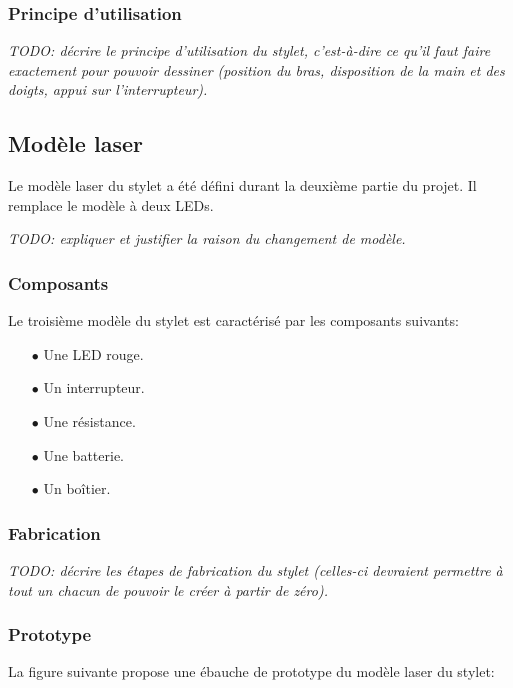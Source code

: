 \documentclass[11pt,a4paper,oldfontcommands]{memoir}
\begin{document}
\subsubsection{Principe d'utilisation}

\textit{TODO: décrire le principe d'utilisation du stylet, c'est-à-dire ce qu'il faut faire exactement pour pouvoir dessiner (position du bras, disposition de la main et des doigts, appui sur l'interrupteur).}

\newpage

\subsection{Modèle laser}

Le modèle laser du stylet a été défini durant la deuxième partie du projet. Il remplace le modèle à deux LEDs.

\textit{TODO: expliquer et justifier la raison du changement de modèle.}

\subsubsection{Composants}

Le troisième modèle du stylet est caractérisé par les composants suivants:

\begin{itemize}
\item[$\bullet$] Une LED rouge.
\item[$\bullet$] Un interrupteur.
\item[$\bullet$] Une résistance.
\item[$\bullet$] Une batterie.
\item[$\bullet$] Un boîtier.
\end{itemize}

\subsubsection{Fabrication}

\textit{TODO: décrire les étapes de fabrication du stylet (celles-ci devraient permettre à tout un chacun de pouvoir le créer à partir de zéro).}

\subsubsection{Prototype}

La figure suivante propose une ébauche de prototype du modèle laser du stylet:
\end{document}
